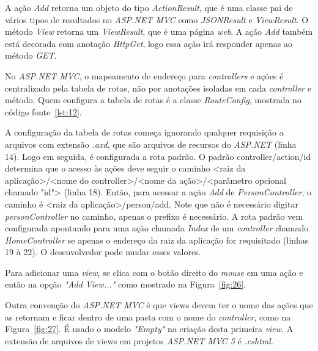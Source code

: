 A ação \textit{Add} retorna um objeto do tipo \textit{ActionResult}, que é uma classe pai de vários tipos de resultados no \textit{ASP.NET MVC} como \textit{JSONResult} e \textit{ViewResult}. O método \textit{View} retorna um \textit{ViewResult}, que é uma página \textit{web}. A ação \textit{Add} também está decorada com anotação \textit{HttpGet}, logo essa ação irá responder apenas ao método \textit{GET}.

No \textit{ASP.NET MVC}, o mapeamento de endereço para \textit{controllers} e ações é centralizado pela tabela de rotas, não por anotações isoladas em cada \textit{controller} e método. Quem configura a tabela de rotas é a classe \textit{RouteConfig}, mostrada no código fonte~\ref{lst:12}.


A configuração da tabela de rotas começa ignorando qualquer requisição a arquivos com extensão \textit{.axd}, que são arquivos de recursos do \textit{ASP.NET} (linha 14). Logo em seguida, é configurada a rota padrão. O padrão {controller}/{action}/{id} determina que o acesso às ações deve seguir o caminho <raiz da aplicação>/<nome do controller>/<nome da ação>/<parâmetro opcional chamado "id"> (linha 18). Então, para acessar a ação \textit{Add} de \textit{PersonController}, o caminho é <raiz da aplicação>/person/add. Note que não é necessário digitar \textit{personController} no caminho, apenas o prefixo é necessário. A rota padrão vem configurada apontando para uma ação chamada \textit{Index} de um \textit{controller} chamado \textit{HomeController} se apenas o endereço da raiz da aplicação for requisitado (linhas 19 à 22). O desenvolvedor pode mudar esses valores. 

Para adicionar uma \textit{view}, se clica com o botão direito do \textit{mouse} em uma ação e então na opção \textit{"Add View..."} como mostrado na Figura~\ref{fig:26}. 


Outra convenção do \textit{ASP.NET MVC} é que views devem ter o nome das ações que as retornam e ficar dentro de uma pasta com o nome do \textit{controller}, como na Figura~\ref{fig:27}. É usado o modelo \textit{"Empty"} na criação desta primeira \textit{view}. A extensão de arquivos de views em projetos \textit{ASP.NET MVC 5} é \textit{.cshtml}.


